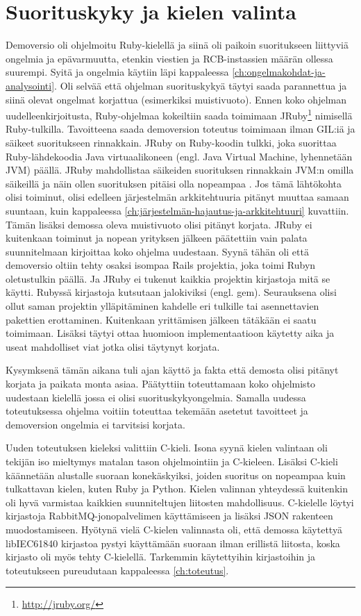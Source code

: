 \section{Suorituskyky ja kielen valinta}
Demoversio oli ohjelmoitu Ruby-kielellä ja siinä oli paikoin suoritukseen liittyviä ongelmia ja epävarmuutta, etenkin viestien ja RCB-instassien määrän ollessa suurempi. Syitä ja ongelmia käytiin läpi kappaleessa \ref{ch:ongelmakohdat-ja-analysointi}. Oli selvää että ohjelman suorituskykyä täytyi saada parannettua ja siinä olevat ongelmat korjattua (esimerkiksi muistivuoto). Ennen koko ohjelman uudelleenkirjoitusta, Ruby-ohjelmaa kokeiltiin saada toimimaan JRuby\footnote{\url{http://jruby.org/}} nimisellä Ruby-tulkilla. Tavoitteena saada demoversion toteutus toimimaan ilman GIL:iä ja säikeet suoritukseen rinnakkain. JRuby on Ruby-koodin tulkki, joka suorittaa Ruby-lähdekoodia Java virtuaalikoneen (engl. Java Virtual Machine, lyhennetään JVM) päällä. JRuby mahdollistaa säikeiden suorituksen rinnakkain JVM:n omilla säikeillä ja näin ollen suorituksen pitäisi olla nopeampaa \cite{Youssef2013}. Jos tämä lähtökohta olisi toiminut, olisi edelleen järjestelmän arkkitehtuuria pitänyt muuttaa samaan suuntaan, kuin kappaleessa \ref{ch:järjestelmän-hajautus-ja-arkkitehtuuri} kuvattiin. Tämän lisäksi demossa oleva muistivuoto olisi pitänyt korjata. JRuby ei kuitenkaan toiminut ja nopean yrityksen jälkeen päätettiin vain palata suunnitelmaan kirjoittaa koko ohjelma uudestaan. Syynä tähän oli että demoversio oltiin tehty osaksi isompaa Rails projektia, joka toimi Rubyn oletustulkin päällä. Ja JRuby ei tukenut kaikkia projektin kirjastoja mitä se käytti. Rubyssä kirjastoja kutsutaan jalokiviksi (engl. gem). Seurauksena olisi ollut saman projektin ylläpitäminen kahdelle eri tulkille tai asennettavien pakettien erottaminen. Kuitenkaan yrittämisen jälkeen tätäkään ei saatu toimimaan. Lisäksi täytyi ottaa huomioon implementaatioon käytetty aika ja useat mahdolliset viat jotka olisi täytynyt korjata.

Kysymksenä tämän aikana tuli ajan käyttö ja fakta että demosta olisi pitänyt korjata ja paikata monta asiaa. Päätyttiin toteuttamaan koko ohjelmisto uudestaan kielellä jossa ei olisi suorituskykyongelmia. Samalla uudessa toteutuksessa ohjelma voitiin toteuttaa tekemään asetetut tavoitteet ja demoversion ongelmia ei tarvitsisi korjata.

Uuden toteutuksen kieleksi valittiin C-kieli. Isona syynä kielen valintaan oli tekijän iso mieltymys matalan tason ohjelmointiin ja C-kieleen. Lisäksi C-kieli käännetään alustalle suoraan konekäskyiksi, joiden suoritus on nopeampaa kuin tulkattavan kielen, kuten Ruby ja Python. Kielen valinnan yhteydessä kuitenkin oli hyvä varmistaa kaikkien suunniteltujen liitosten mahdollisuus. C-kielelle löytyi kirjastoja RabbitMQ-jonopalvelimen käyttämiseen ja lisäksi JSON rakenteen muodostamiseen. Hyötynä vielä C-kielen valinnasta oli, että demossa käytettyä libIEC61840 kirjastoa pystyi käyttämään suoraan ilman erillistä liitosta, koska kirjasto oli myös tehty C-kielellä. Tarkemmin käytettyihin kirjastoihin ja toteutukseen pureudutaan kappaleessa \ref{ch:toteutus}.


